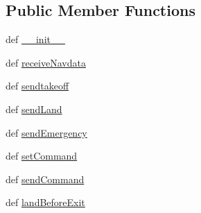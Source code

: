 \subsection*{Public Member Functions}
\begin{DoxyCompactItemize}
\item 
def \hyperlink{classbasicdronecontroller_1_1basicDroneController_a9bd81e29fd08aadc783b88741927d37a}{\-\_\-\-\_\-init\-\_\-\-\_\-}
\item 
def \hyperlink{classbasicdronecontroller_1_1basicDroneController_acd648a8a012fc871ab85d600ef5b4076}{receive\-Navdata}
\item 
def \hyperlink{classbasicdronecontroller_1_1basicDroneController_aa9322ef1dca7727b1fa406a4a590753d}{sendtakeoff}
\item 
def \hyperlink{classbasicdronecontroller_1_1basicDroneController_ae5a8f73cf76fcb94cf90b10df1252a80}{send\-Land}
\item 
def \hyperlink{classbasicdronecontroller_1_1basicDroneController_a1c23d1454ad676473271933e8d6ec2fa}{send\-Emergency}
\item 
def \hyperlink{classbasicdronecontroller_1_1basicDroneController_a34f77a0edfe08f4aa8c2d92dc7141a7e}{set\-Command}
\item 
def \hyperlink{classbasicdronecontroller_1_1basicDroneController_af7a7f58aa7fc27e4e26e53c521dd30d1}{send\-Command}
\item 
def \hyperlink{classbasicdronecontroller_1_1basicDroneController_ac1fdffd4ba5cdd00b830742d3223b402}{land\-Before\-Exit}
\end{DoxyCompactItemize}
